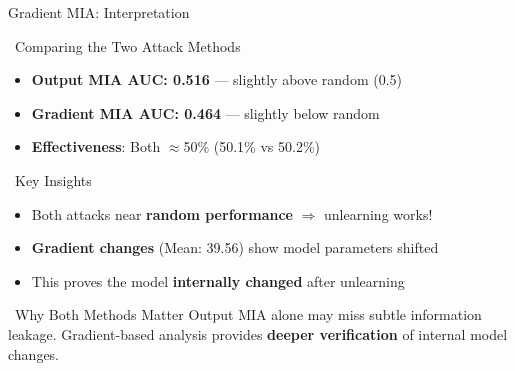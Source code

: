\documentclass[aspectratio=169, 11pt]{beamer}
\begin{document}
\begin{frame}{Gradient MIA: Interpretation}
    \begin{block}{\faChartBar\ Comparing the Two Attack Methods}
        \begin{itemize}
            \item \textbf{Output MIA AUC: 0.516} --- slightly above random (0.5)
            \item \textbf{Gradient MIA AUC: 0.464} --- slightly below random
            \item \textbf{Effectiveness}: Both $\approx$50\% (50.1\% vs 50.2\%)
        \end{itemize}
    \end{block}
    
    \vspace{0.3em}
    \begin{exampleblock}{\faLightbulb\ Key Insights}
        \begin{itemize}
            \item Both attacks near \textbf{random performance} $\Rightarrow$ unlearning works!
            \item \textbf{Gradient changes} (Mean: 39.56) show model parameters shifted
            \item This proves the model \textbf{internally changed} after unlearning
        \end{itemize}
    \end{exampleblock}
    
    \vspace{0.3em}
    \begin{alertblock}{\faExclamationTriangle\ Why Both Methods Matter}
        Output MIA alone may miss subtle information leakage. Gradient-based analysis provides \textbf{deeper verification} of internal model changes.
    \end{alertblock}
\end{frame}
\end{document}

